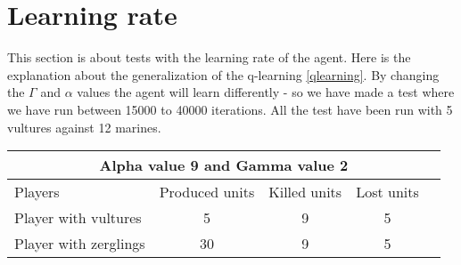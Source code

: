 \section{Learning rate}
This section is about tests with the learning rate of the agent. Here is the explanation about the generalization of the q-learning \ref{qlearning}.
By changing the $\Gamma$ and $\alpha$ values the agent will learn differently - so we have made a test where we have run between 15000 to 40000 iterations. All the test have been run with 5 vultures against 12 marines.


\begin{centering}
 \begin{tabular}{|l||c|c|c|c|}
	\multicolumn{5}{c}{Alpha value 9 and Gamma value 2} \\
	\hline
	Players & Produced units & Killed units & Lost units\\
	\hline
	\hline
		Player with vultures & 5 & 9 & 5 \\
	\hline
		Player with zerglings & 30 & 9 & 5\\
	\hline

\end{tabular}
\end{centering}